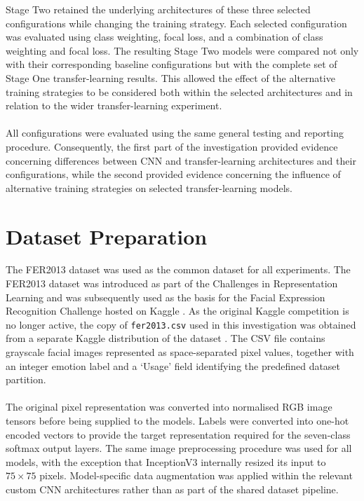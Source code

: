 \documentclass[12pt, a4paper]{report}
\let\oldsection\section
\renewcommand{\section}{%
    \Needspace{6\baselineskip}%
    \oldsection
}
\begin{document}
				Stage Two retained the underlying architectures of these three selected configurations while changing the training strategy. Each selected configuration was evaluated using class weighting, focal loss, and a combination of class weighting and focal loss. The resulting Stage Two models were compared not only with their corresponding baseline configurations but with the complete set of Stage One transfer-learning results. This allowed the effect of the alternative training strategies to be considered both within the selected architectures and in relation to the wider transfer-learning experiment.\\\\
				All configurations were evaluated using the same general testing and reporting procedure. Consequently, the first part of the investigation provided evidence concerning differences between CNN and transfer-learning architectures and their configurations, while the second provided evidence concerning the influence of alternative training strategies on selected transfer-learning models.

		\section{Dataset Preparation}
			
			The FER2013 dataset was used as the common dataset for all experiments. The FER2013 dataset was introduced as part of the Challenges in Representation Learning \cite{goodfellow2015challenges} and was subsequently used as the basis for the Facial Expression Recognition Challenge hosted on Kaggle \cite{fer2013_kaggle}. As the original Kaggle competition is no longer active, the copy of \texttt{fer2013.csv} used in this investigation was obtained from a separate Kaggle distribution of the dataset \cite{ahmed_fer2013_kaggle}. The CSV file contains grayscale facial images represented as space-separated pixel values, together with an integer emotion label and a `Usage' field identifying the predefined dataset partition.\\\\
				The original pixel representation was converted into normalised RGB image tensors before being supplied to the models. Labels were converted into one-hot encoded vectors to provide the target representation required for the seven-class softmax output layers. The same image preprocessing procedure was used for all models, with the exception that InceptionV3 internally resized its input to $75\times75$ pixels. Model-specific data augmentation was applied within the relevant custom CNN architectures rather than as part of the shared dataset pipeline.
			
\end{document}
